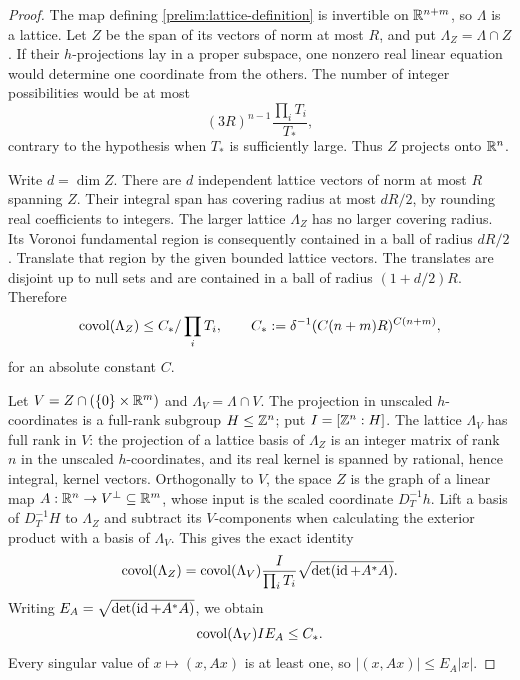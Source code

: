 \begin{proof}
The map defining \eqref{prelim:lattice-definition} is invertible on
$\mathbb R^{n+m}$, so $\Lambda$ is a lattice.  Let $Z$ be the span of its
vectors of norm at most $R$, and put $\Lambda_Z=\Lambda\cap Z$.
If their $h$-projections lay in a proper subspace, one nonzero real
linear equation would determine one coordinate from the others.
The number of integer possibilities would be at most
\[
 (3R)^{n-1}\frac{\prod_iT_i}{T_*},
\]
contrary to the hypothesis when $T_*$ is sufficiently large.
Thus $Z$ projects onto $\mathbb R^n$.

Write $d=\dim Z$.  There are $d$ independent lattice vectors of
norm at most $R$ spanning $Z$.  Their integral span has covering
radius at most $dR/2$, by rounding real coefficients to integers.
The larger lattice $\Lambda_Z$ has no larger covering radius.
Its Voronoi fundamental region is consequently contained in a ball
of radius $dR/2$.  Translate that region by the given bounded
lattice vectors.  The translates are disjoint up to null sets and
are contained in a ball of radius $(1+d/2)R$.  Therefore
\begin{equation}\label{prelim:lattice-covolume}
 \operatorname{covol}(\Lambda_Z)\leq C_*/\prod_iT_i,
 \qquad
 C_*:=\delta^{-1}(C(n+m)R)^{C(n+m)},
\end{equation}
for an absolute constant $C$.

Let $V=Z\cap(\{0\}\times\mathbb R^m)$ and
$\Lambda_V=\Lambda\cap V$.  The projection in unscaled
$h$-coordinates is a full-rank subgroup $H\leq\mathbb Z^n$; put
$I=[\mathbb Z^n:H]$.  The lattice $\Lambda_V$ has full rank in $V$:
the projection of a lattice basis of $\Lambda_Z$ is an integer
matrix of rank $n$ in the unscaled $h$-coordinates, and its real
kernel is spanned by rational, hence integral, kernel vectors.
Orthogonally to $V$, the space $Z$ is the graph
of a linear map $A:\mathbb R^n\to V^\perp\subseteq\mathbb R^m$,
whose input is the scaled coordinate $D_T^{-1}h$.
Lift a basis of $D_T^{-1}H$ to $\Lambda_Z$ and subtract its
$V$-components when calculating the exterior product with a basis
of $\Lambda_V$.  This gives the exact identity
\[
 \operatorname{covol}(\Lambda_Z)=
 \operatorname{covol}(\Lambda_V)\frac{I}{\prod_iT_i}
 \sqrt{\det(\operatorname{id}+A^*A)}.
\]
Writing $E_A=\sqrt{\det(\operatorname{id}+A^*A)}$, we obtain
\begin{equation}\label{prelim:lattice-product}
 \operatorname{covol}(\Lambda_V)I E_A\leq C_*.
\end{equation}
Every singular value of $x\mapsto(x,Ax)$ is at least one, so
$|(x,Ax)|\leq E_A|x|$.


\end{proof}
